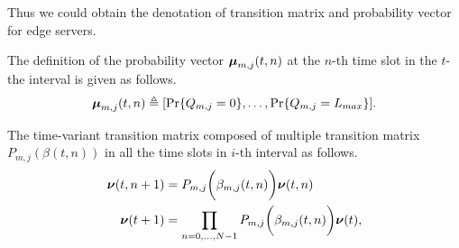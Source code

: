 Thus we could obtain the denotation of transition matrix and probability vector for edge servers.
\begin{definition}
    The definition of the probability vector $\boldsymbol{\mu}_{m,j}(t,n)$ at the $n$-th time slot in the $t$-the interval is given as follows.
    \begin{align}
        \boldsymbol{\mu}_{m,j}(t,n) \triangleq [\Pr\{Q_{m,j}=0\}, \dots, \Pr\{Q_{m,j}=L_{max}\}].
    \end{align}

    The time-variant transition matrix composed of multiple transition matrix $P_{m,j}(\beta({t,n}))$ in all the time slots in $i$-th interval as follows.
    \begin{align}
        \boldsymbol{\nu}({t,n+1}) &= P_{m,j}\bigg(\beta_{m,j}({t,n})\bigg) \boldsymbol{\nu}({t,n})
        \\
        \boldsymbol{\nu}(t+1) &= \prod_{n=0,\dots,N-1} P_{m,j}\bigg(\beta_{m,j}({t,n})\bigg) \boldsymbol{\nu}(t),
        \label{eqn_4}
    \end{align}
\end{definition}

